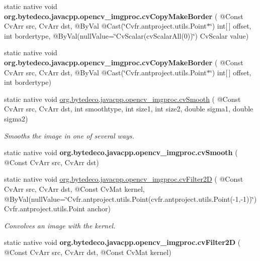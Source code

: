 \begin{DoxyCompactItemize}
\mbox{\label{group__imgproc__c_gabb593ab2191f24286ad60f804a3accc9}} 
static native void {\bfseries org.\+bytedeco.\+javacpp.\+opencv\+\_\+imgproc.\+cv\+Copy\+Make\+Border} ( @Const Cv\+Arr src, Cv\+Arr dst, @By\+Val @Cast(\char`\"{}Cv\+fr.antproject.utils.Point$\ast$\char`\"{}) int\mbox{[}$\,$\mbox{]} offset, int bordertype, @By\+Val(null\+Value=\char`\"{}Cv\+Scalar(cv\+Scalar\+All(0))\char`\"{}) Cv\+Scalar value)
\item 
\mbox{\label{group__imgproc__c_ga897db9c2bd9a4fed6a2105c60cec0366}} 
static native void {\bfseries org.\+bytedeco.\+javacpp.\+opencv\+\_\+imgproc.\+cv\+Copy\+Make\+Border} ( @Const Cv\+Arr src, Cv\+Arr dst, @By\+Val @Cast(\char`\"{}Cv\+fr.antproject.utils.Point$\ast$\char`\"{}) int\mbox{[}$\,$\mbox{]} offset, int bordertype)
\item 
static native void \hyperlink{group__imgproc__c_ga32746ef0800c2dfaad0e63fd8138362d}{org.\+bytedeco.\+javacpp.\+opencv\+\_\+imgproc.\+cv\+Smooth} ( @Const Cv\+Arr src, Cv\+Arr dst, int smoothtype, int size1, int size2, double sigma1, double sigma2)
\begin{DoxyCompactList}\small\item\em Smooths the image in one of several ways. \end{DoxyCompactList}\item 
\mbox{\label{group__imgproc__c_gaeee0d8ead6e7afe4492e929135e892fc}} 
static native void {\bfseries org.\+bytedeco.\+javacpp.\+opencv\+\_\+imgproc.\+cv\+Smooth} ( @Const Cv\+Arr src, Cv\+Arr dst)
\item 
static native void \hyperlink{group__imgproc__c_gaeb0ce4259621b5151099fcc7d4c25522}{org.\+bytedeco.\+javacpp.\+opencv\+\_\+imgproc.\+cv\+Filter2D} ( @Const Cv\+Arr src, Cv\+Arr dst, @Const Cv\+Mat kernel, @By\+Val(null\+Value=\char`\"{}Cv\+fr.antproject.utils.Point(cv\+fr.antproject.utils.Point(-\/1,-\/1))\char`\"{}) Cv\+fr.antproject.utils.Point anchor)
\begin{DoxyCompactList}\small\item\em Convolves an image with the kernel. \end{DoxyCompactList}\item 
\mbox{\label{group__imgproc__c_ga7b2b42203453476412b28c1a573f7dcc}} 
static native void {\bfseries org.\+bytedeco.\+javacpp.\+opencv\+\_\+imgproc.\+cv\+Filter2D} ( @Const Cv\+Arr src, Cv\+Arr dst, @Const Cv\+Mat kernel)

\end{DoxyCompactItemize}
